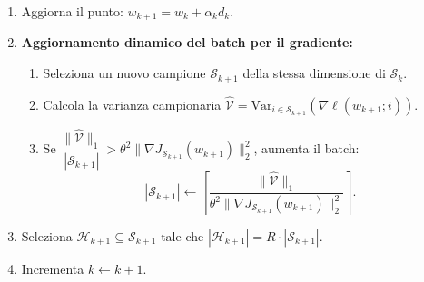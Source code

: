 \documentclass[a4paper,12pt]{article}
\numberwithin{equation}{section}
\numberwithin{figure}{section}
\numberwithin{table}{section}
\newcommand{\Var}{\mathrm{Var}}
\begin{document}
\begin{actionbox}
\begin{enumerate}
    \item Aggiorna il punto: $w_{k+1} = w_k + \alpha_k d_k$.
    
    \item \textbf{Aggiornamento dinamico del batch per il gradiente:}
    \begin{enumerate}
      \item Seleziona un nuovo campione $\mathcal{S}_{k+1}$ della stessa dimensione di $\mathcal{S}_k$.
      \item Calcola la varianza campionaria $\widehat{\mathcal{V}} = \Var_{i \in \mathcal{S}_{k+1}}(\nabla \ell(w_{k+1};i))$.
      \item Se $\dfrac{\|\widehat{\mathcal{V}}\|_1}{|\mathcal{S}_{k+1}|} > \theta^2 \|\nabla J_{\mathcal{S}_{k+1}}(w_{k+1})\|_2^2$, aumenta il batch:
      \[
      |\mathcal{S}_{k+1}| \leftarrow \left\lceil \dfrac{\|\widehat{\mathcal{V}}\|_1}{\theta^2 \|\nabla J_{\mathcal{S}_{k+1}}(w_{k+1})\|_2^2} \right\rceil.
      \]
    \end{enumerate}
    
    \item
    Seleziona $\mathcal{H}_{k+1} \subseteq \mathcal{S}_{k+1}$ tale che $|\mathcal{H}_{k+1}| = R \cdot |\mathcal{S}_{k+1}|$.
    
    \item Incrementa $k \leftarrow k+1$.
  \end{enumerate}
\end{actionbox}
\end{document}
